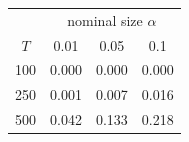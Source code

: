 % 
\begin{tabular}{cccc}
  \hline
  & \multicolumn{3}{c}{nominal size $\alpha$} \\
 $T$ & 0.01 & 0.05 & 0.1 \\
 \hline
100 & 0.000 & 0.000 & 0.000 \\ 
  250 & 0.001 & 0.007 & 0.016 \\ 
  500 & 0.042 & 0.133 & 0.218 \\ 
   \hline
\end{tabular}

